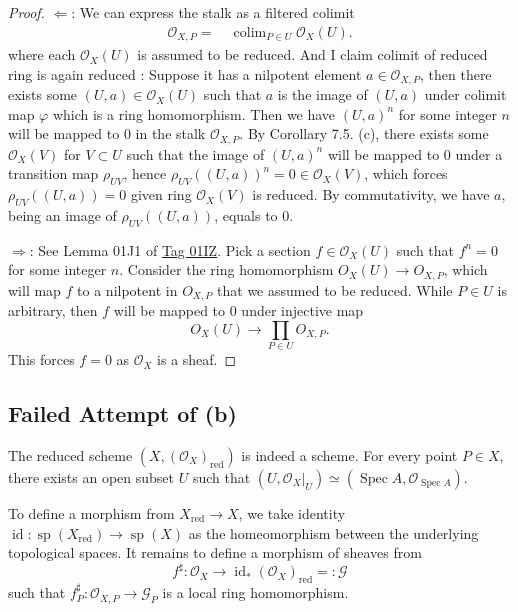\begin{proof}
    $\Leftarrow$:
    We can express the stalk as a filtered colimit 
    \begin{align*}
        \mathcal O_{X,P}
        =&~ \operatorname{colim}_{P\in U}\mathcal O_X(U).
    \end{align*} where each $\mathcal O_X(U)$ is assumed to be reduced. 
    And I claim colimit of reduced ring is again reduced :
    Suppose it has a nilpotent element $a\in\mathcal O_{X,P}$, then there exists some $(U,a)\in \mathcal O_X(U)$ such that $a$ is the image of $(U,a)$ under colimit map $\varphi$ which is a ring homomorphism. Then we have $(U,a)^n$ for some integer $n$ will be mapped to $0$ in the stalk $\mathcal O_{X,P}$. By \cite{altman2013term} Corollary 7.5. (c), there exists some $\mathcal O_X(V)$ for $V\subset U$ such that the image of $(U,a)^n$ will be mapped to $0$ under a transition map $\rho_{UV}$, hence $\rho_{UV}((U,a))^n=0\in\mathcal O_X(V)$, which forces $\rho_{UV}((U,a))=0$ given ring $\mathcal O_X(V)$ is reduced. By commutativity, we have $a$, being an image of $\rho_{UV}((U,a))$, equals to $0$. 

    $\Rightarrow$: 
    See Lemma 01J1 of \href{https://stacks.math.columbia.edu/tag/01IZ}{Tag 01IZ}. 
    Pick a section $f\in\mathcal O_X(U)$ such that $f^n=0$ for some integer $n$. 
    Consider the ring homomorphism $O_X(U)\to O_{X,P}$, which will map $f$ to a nilpotent in $O_{X,P}$ that we assumed to be reduced. While $P\in U$ is arbitrary, then $f$ will be mapped to $0$ under injective map 
    \[O_X(U)\to \prod_{P\in U}O_{X,P}.\] This forces $f=0$ as $\mathcal O_X$ is a sheaf.
\end{proof} 

\subsection{Failed Attempt of (b)}
The reduced scheme $(X,(\mathcal O_X)_{\text{red}})$ is indeed a scheme. For every point $P\in X$, there exists an open subset $U$ such that $(U,\mathcal O_X\vert_U)\simeq (\operatorname{Spec}A,\mathcal O_{\operatorname{Spec}A})$.

To define a morphism from $X_{\text{red}}\to X$, we take identity $\operatorname{id}:\operatorname{sp}(X_{\text{red}})\to\operatorname{sp}(X)$ as the homeomorphism between the underlying topological spaces. It remains to define a morphism of sheaves from 
\[f^{\sharp}:\mathcal O_X\to\operatorname{id}_{\ast}(\mathcal O_X)_{\text{red}}=:\mathcal G\] such that $f^{\sharp}_P:\mathcal O_{X,P}\to \mathcal G_P$ is a local ring homomorphism. 

